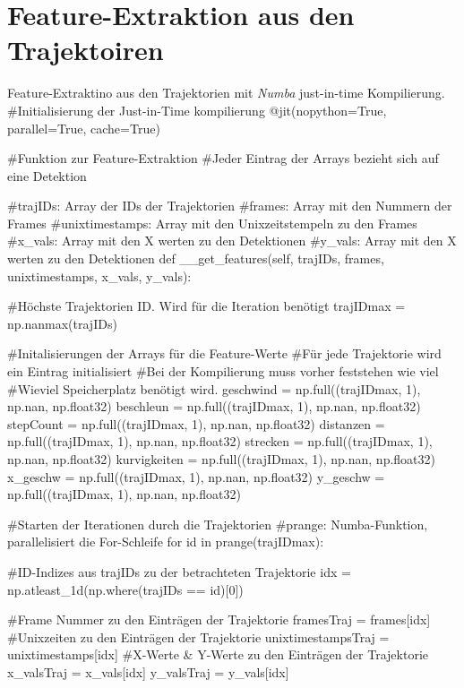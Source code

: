 \clearpage
\section*{Feature-Extraktion aus den Trajektoiren}

\begin{pythoncodeAnhang}{Feature-Extraktino aus den Trajektorien mit \textit{Numba} just-in-time Kompilierung.}
#Initialisierung der Just-in-Time kompilierung
@jit(nopython=True, parallel=True, cache=True)

#Funktion zur Feature-Extraktion
#Jeder Eintrag der Arrays bezieht sich auf eine Detektion

#trajIDs:        Array der IDs der Trajektorien
#frames:         Array mit den Nummern der Frames
#unixtimestamps: Array mit den Unixzeitstempeln zu den Frames
#x_vals:         Array mit den X werten zu den Detektionen
#y_vals:         Array mit den X werten zu den Detektionen
def __get_features(self, trajIDs, frames, unixtimestamps, 
                x_vals, y_vals):
    
    #Höchste Trajektorien ID. Wird für die Iteration benötigt
    trajIDmax = np.nanmax(trajIDs)

    #Initalisierungen der Arrays für die Feature-Werte
    #Für jede Trajektorie wird ein Eintrag initialisiert
    #Bei der Kompilierung muss vorher feststehen wie viel
    #Wieviel Speicherplatz benötigt wird.
    geschwind = np.full((trajIDmax, 1), np.nan, np.float32)
    beschleun = np.full((trajIDmax, 1), np.nan, np.float32)
    stepCount = np.full((trajIDmax, 1), np.nan, np.float32)
    distanzen = np.full((trajIDmax, 1), np.nan, np.float32)
    strecken = np.full((trajIDmax, 1), np.nan, np.float32)
    kurvigkeiten = np.full((trajIDmax, 1), np.nan, np.float32)
    x_geschw = np.full((trajIDmax, 1), np.nan, np.float32)
    y_geschw = np.full((trajIDmax, 1), np.nan, np.float32)

    #Starten der Iterationen durch die Trajektorien
    #prange: Numba-Funktion, parallelisiert die For-Schleife 
    for id in prange(trajIDmax):

        #ID-Indizes aus trajIDs zu der betrachteten Trajektorie
        idx = np.atleast_1d(np.where(trajIDs == id)[0])

        #Frame Nummer zu den Einträgen der Trajektorie
        framesTraj = frames[idx]    
        #Unixzeiten zu den Einträgen der Trajektorie
        unixtimestampsTraj = unixtimestamps[idx] 
        #X-Werte & Y-Werte zu den Einträgen der Trajektorie
        x_valsTraj = x_vals[idx]
        y_valsTraj = y_vals[idx]


\end{pythoncodeAnhang}
